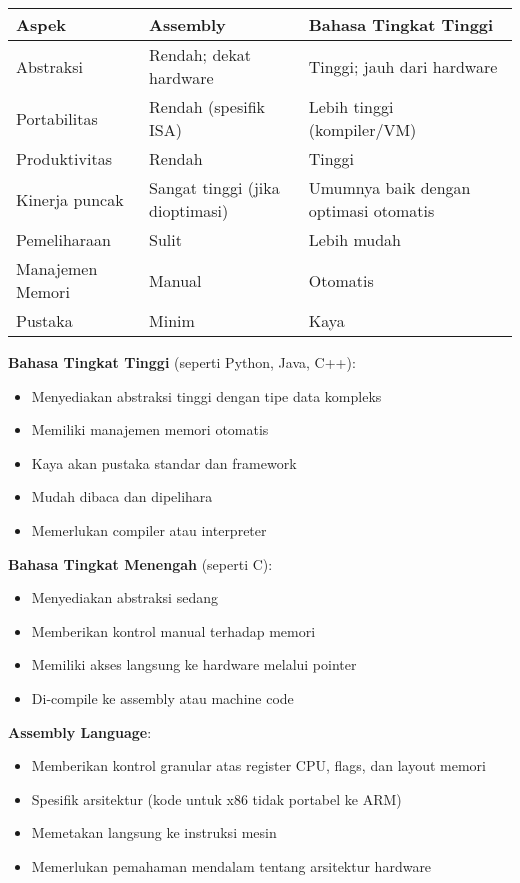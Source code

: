 \documentclass[../main.tex]{subfiles}
\begin{document}
\begin{center}
\begin{tabular}{p{} p{} p{}}
\hline
\textbf{Aspek} & \textbf{Assembly} & \textbf{Bahasa Tingkat Tinggi} \\
\hline
Abstraksi & Rendah; dekat hardware & Tinggi; jauh dari hardware \\
Portabilitas & Rendah (spesifik ISA) & Lebih tinggi (kompiler/VM) \\
Produktivitas & Rendah & Tinggi \\
Kinerja puncak & Sangat tinggi (jika dioptimasi) & Umumnya baik dengan optimasi otomatis \\
Pemeliharaan & Sulit & Lebih mudah \\
Manajemen Memori & Manual & Otomatis \\
Pustaka & Minim & Kaya \\
\hline
\end{tabular}
\end{center}

\textbf{Bahasa Tingkat Tinggi} (seperti Python, Java, C++):
\begin{itemize}
    \item Menyediakan abstraksi tinggi dengan tipe data kompleks
    \item Memiliki manajemen memori otomatis
    \item Kaya akan pustaka standar dan framework
    \item Mudah dibaca dan dipelihara
    \item Memerlukan compiler atau interpreter
\end{itemize}

\textbf{Bahasa Tingkat Menengah} (seperti C):
\begin{itemize}
    \item Menyediakan abstraksi sedang
    \item Memberikan kontrol manual terhadap memori
    \item Memiliki akses langsung ke hardware melalui pointer
    \item Di-compile ke assembly atau machine code
\end{itemize}

\textbf{Assembly Language}:
\begin{itemize}
    \item Memberikan kontrol granular atas register CPU, flags, dan layout memori
    \item Spesifik arsitektur (kode untuk x86 tidak portabel ke ARM)
    \item Memetakan langsung ke instruksi mesin
    \item Memerlukan pemahaman mendalam tentang arsitektur hardware
\end{itemize}
\end{document}
